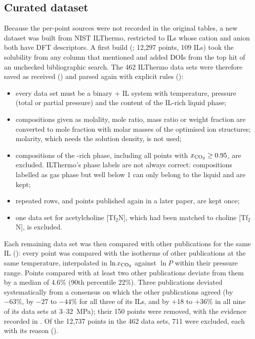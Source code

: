 \subsection{Curated dataset}
\label{sec:curated}
Because the per-point sources were not recorded in the original tables, a new dataset was built from NIST ILThermo\cite{dong2007ilthermo}, restricted to ILs whose cation and anion both have DFT descriptors. A first build (; 12,297 points, 109 ILs) took the solubility from any column that mentioned \co{} and added DOIs from the top hit of an unchecked bibliographic search. The 462 ILThermo data sets were therefore saved as received () and parsed again with explicit rules ():
\begin{itemize}
    \item every data set must be a binary \co{} + IL system with temperature, pressure (total or \co{} partial pressure) and the \co{} content of the IL-rich liquid phase;
    \item compositions given as molality, mole ratio, mass ratio or weight fraction are converted to mole fraction with molar masses of the optimised ion structures; molarity, which needs the solution density, is not used;
    \item compositions of the \co{}-rich phase, including all points with $x_{\mathrm{CO_2}} \geq 0.95$, are excluded. ILThermo's phase labels are not always correct: compositions labelled as gas phase but well below 1 can only belong to the liquid and are kept;
    \item repeated rows, and points published again in a later paper, are kept once;
    \item one data set for acetylcholine [Tf$_2$N], which had been matched to choline [Tf$_2$N], is excluded.
\end{itemize}
Each remaining data set was then compared with other publications for the same IL (): every point was compared with the isotherms of other publications at the same temperature, interpolated in $\ln x_{\mathrm{CO_2}}$ against $\ln P$ within their pressure range. Points compared with at least two other publications deviate from them by a median of 4.6\% (90th percentile 22\%). Three publications deviated systematically from a consensus on which the other publications agreed (by $-63\%$, by $-27$ to $-44\%$ for all three of its ILs, and by $+18$ to $+36\%$ in all nine of its data sets at 3--32~MPa); their 150 points were removed, with the evidence recorded in . Of the 12,737 points in the 462 data sets, 711 were excluded, each with its reason ().

